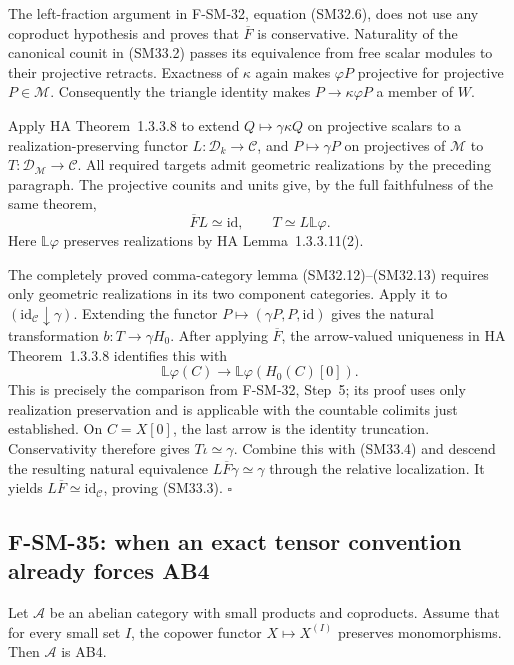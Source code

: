 \documentclass[11pt,a4paper]{article}
\theoremstyle{definition}\newtheorem{definition}[theorem]{Definition}
\theoremstyle{remark}\newtheorem{remark}[theorem]{Remark}
\begin{document}
The left-fraction argument in F-SM-32, equation (SM32.6),
does not use any coproduct hypothesis and proves that
\(\overline F\) is conservative.  Naturality of the
canonical counit in (SM33.2) passes its equivalence from
free scalar modules to their projective retracts.
Exactness of \(\kappa\) again makes \(\varphi P\)
projective for projective \(P\in\mathcal M\).
Consequently the triangle identity makes
\(P\to\kappa\varphi P\) a member of \(W\).

Apply HA Theorem~1.3.3.8 to extend
\(Q\mapsto\gamma\kappa Q\) on projective scalars to a
realization-preserving functor \(L:\mathcal D_k\to\mathcal C\),
and \(P\mapsto\gamma P\) on projectives of \(\mathcal M\)
to \(T:\mathcal D_{\mathcal M}\to\mathcal C\).
All required targets admit geometric realizations by the
preceding paragraph.  The projective counits and units give,
by the full faithfulness of the same theorem,
\[
                 \overline F L\simeq\mathrm{id},\qquad
                         T\simeq L\mathbb L\varphi.           \tag{SM33.4}
\]
Here \(\mathbb L\varphi\) preserves realizations by
HA Lemma~1.3.3.11(2).

The completely proved comma-category lemma (SM32.12)--(SM32.13)
requires only geometric realizations in its two component
categories.  Apply it to
\((\mathrm{id}_{\mathcal C}\downarrow\gamma)\).
Extending the functor \(P\mapsto(\gamma P,P,\mathrm{id})\)
gives the natural transformation \(b:T\to\gamma H_0\).
After applying \(\overline F\), the arrow-valued uniqueness
in HA Theorem~1.3.3.8 identifies this with
\[
          \mathbb L\varphi(C)\longrightarrow
                          \mathbb L\varphi(H_0(C)[0]).
\]
This is precisely the comparison from F-SM-32, Step~5;
its proof uses only realization preservation and is
applicable with the countable colimits just established.
On \(C=X[0]\), the last arrow is the identity truncation.
Conservativity therefore gives \(T\iota\simeq\gamma\).
Combine this with (SM33.4) and descend the resulting natural
equivalence \(L\overline F\gamma\simeq\gamma\) through
the relative localization.  It yields
\(L\overline F\simeq\mathrm{id}_{\mathcal C}\), proving
(SM33.3). \(\square\)

\subsection{F-SM-35: when an exact tensor convention already forces AB4}
Let \(\mathcal A\) be an abelian category with small products
and coproducts.  Assume that for every small set \(I\), the
copower functor \(X\mapsto X^{(I)}\) preserves monomorphisms.
Then \(\mathcal A\) is AB4.
\end{document}
